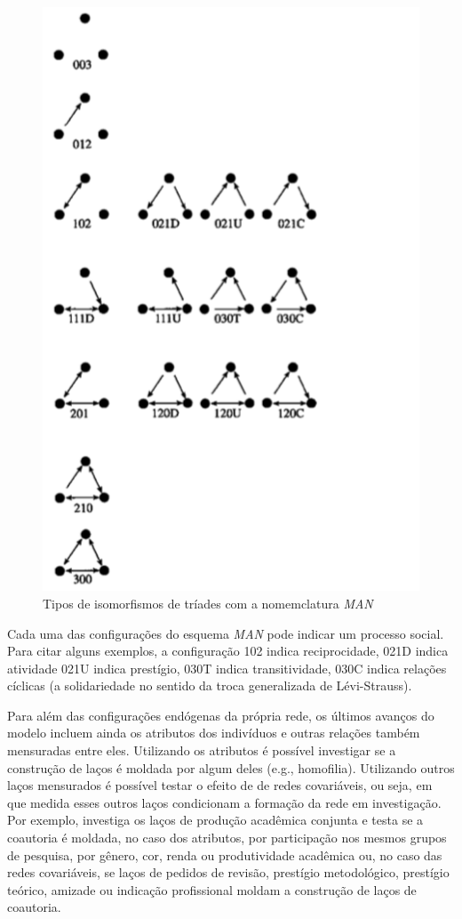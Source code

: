 \documentclass[a4paper, 12pt, openright, oneside, german, french, english, brazil]{abntex2}
\begin{document}
	
	\begin{figure}[!ht]
		\centering
		\caption{Tipos de isomorfismos de tríades com a nomemclatura \textit{MAN}}
		\label{triades-man}
		\includegraphics[scale=.6]{triades.png}
	\end{figure}
	
	Cada uma das configurações do esquema \textit{MAN} pode indicar um processo social. Para citar alguns exemplos, a configuração 102 indica reciprocidade, 021D indica atividade 021U indica prestígio, 030T indica transitividade, 030C indica relações cíclicas (a solidariedade no sentido da troca generalizada de Lévi-Strauss).
	
	Para além das configurações endógenas da própria rede, os últimos avanços do modelo incluem ainda os atributos dos indivíduos e outras relações também mensuradas entre eles. Utilizando os atributos é possível investigar se a construção de laços é moldada por algum deles (e.g., homofilia). Utilizando outros laços mensurados é possível testar o efeito de de redes covariáveis, ou seja, em que medida esses outros laços condicionam a formação da rede em investigação. Por exemplo,  investiga os laços de produção acadêmica conjunta e testa se a coautoria é moldada, no caso dos atributos, por participação nos mesmos grupos de pesquisa, por gênero, cor, renda ou produtividade acadêmica ou, no caso das redes covariáveis, se laços de pedidos de revisão, prestígio metodológico, prestígio teórico, amizade ou indicação profissional moldam a construção de laços de coautoria.
	
\end{document}

